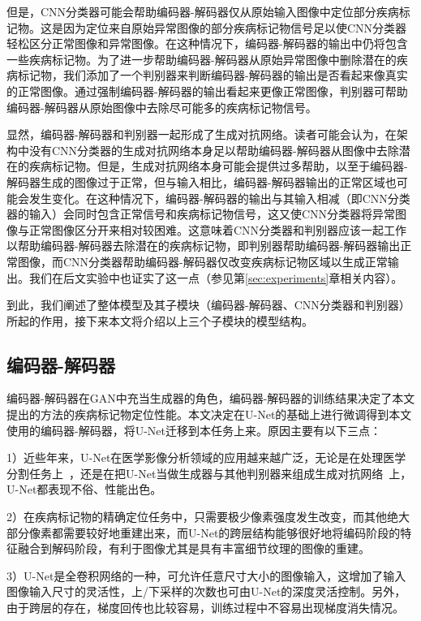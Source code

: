 但是，CNN分类器可能会帮助编码器-解码器仅从原始输入图像中定位部分疾病标记物。这是因为定位来自原始异常图像的部分疾病标记物信号足以使CNN分类器轻松区分正常图像和异常图像。在这种情况下，编码器-解码器的输出中仍将包含一些疾病标记物。为了进一步帮助编码器-解码器从原始异常图像中删除潜在的疾病标记物，我们添加了一个判别器来判断编码器-解码器的输出是否看起来像真实的正常图像。通过强制编码器-解码器的输出看起来更像正常图像，判别器可帮助编码器-解码器从原始图像中去除尽可能多的疾病标记物信号。

显然，编码器-解码器和判别器一起形成了生成对抗网络。读者可能会认为，在架构中没有CNN分类器的生成对抗网络本身足以帮助编码器-解码器从图像中去除潜在的疾病标记物。但是，生成对抗网络本身可能会提供过多帮助，以至于编码器-解码器生成的图像过于正常，但与输入相比，编码器-解码器输出的正常区域也可能会发生变化。在这种情况下，编码器-解码器的输出与其输入相减（即CNN分类器的输入）会同时包含正常信号和疾病标记物信号，这又使CNN分类器将异常图像与正常图像区分开来相对较困难。这意味着CNN分类器和判别器应该一起工作以帮助编码器-解码器去除潜在的疾病标记物，即判别器帮助编码器-解码器输出正常图像，而CNN分类器帮助编码器-解码器仅改变疾病标记物区域以生成正常输出。我们在后文实验中也证实了这一点（参见第\ref{sec:experiments}章相关内容）。

到此，我们阐述了整体模型及其子模块（编码器-解码器、CNN分类器和判别器）所起的作用，接下来本文将介绍以上三个子模块的模型结构。

\subsection{编码器-解码器}\label{subsec:encoder_decoder_model}
编码器-解码器在GAN中充当生成器的角色，编码器-解码器的训练结果决定了本文提出的方法的疾病标记物定位性能。本文决定在U-Net的基础上进行微调得到本文使用的编码器-解码器，将U-Net迁移到本任务上来。原因主要有以下三点：

1）近些年来，U-Net在医学影像分析领域的应用越来越广泛，无论是在处理医学分割任务上~\cite{oktay2018attention, dong2017automatic}，还是在把U-Net当做生成器与其他判别器来组成生成对抗网络~\cite{Han2018SpineGANSS}上，U-Net都表现不俗、性能出色。

2）在疾病标记物的精确定位任务中，只需要极少像素强度发生改变，而其他绝大部分像素都需要较好地重建出来，而U-Net的跨层结构能够很好地将编码阶段的特征融合到解码阶段，有利于图像尤其是具有丰富细节纹理的图像的重建。

3）U-Net是全卷积网络的一种，可允许任意尺寸大小的图像输入，这增加了输入图像输入尺寸的灵活性，上/下采样的次数也可由U-Net的深度灵活控制。另外，由于跨层的存在，梯度回传也比较容易，训练过程中不容易出现梯度消失情况。

